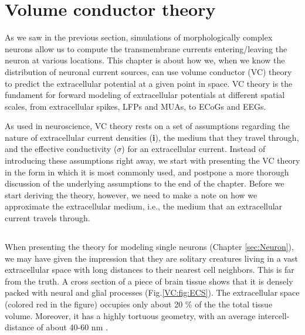 \section{Volume conductor theory}
\label{sec:VC}

As we saw in the previous section, simulations of morphologically complex neurons allow us to compute the transmembrane currents entering/leaving the neuron at various locations. This chapter is about how we, when we know the distribution of neuronal current sources, can use volume conductor (VC) theory to predict the extracellular potential at a given point in space. VC theory is the fundament for forward modeling of extracellular potentials at different spatial scales, from extracellular spikes, LFPs and MUAs, to ECoGs and EEGs.

As used in neuroscience, VC theory rests on a set of assumptions regarding the nature of extracellular current densities ({\bf i}), the medium that they travel through, and the effective conductivity ($\sigma$) for an extracellular current. Instead of introducing these assumptions right away, we start with presenting the VC theory in the form in which it is most commonly used, and postpone a more thorough discussion of the underlying assumptions to the end of the chapter. Before we start deriving the theory, however, we need to make a note on how we approximate the extracellular medium, i.e., the medium that an extracellular current travels through.


\subsection{}
\label{sec:continuous}
When presenting the theory for modeling single neurons (Chapter \ref{sec:Neuron}), we may have given the impression that they are solitary creatures living in a vast extracellular space with long distances to their nearest cell neighbors. This is far from the truth. A cross section of a piece of brain tissue shows that it is densely packed with neural and glial processes (Fig.\ref{VC:fig:ECS}). The extracellular space (colored red in the figure) occupies only about 20 \% of the the total tissue volume. Moreover, it has a highly tortuous geometry, with an average intercell-distance of about 40-60 nm \citep{Sykova2008}. 

